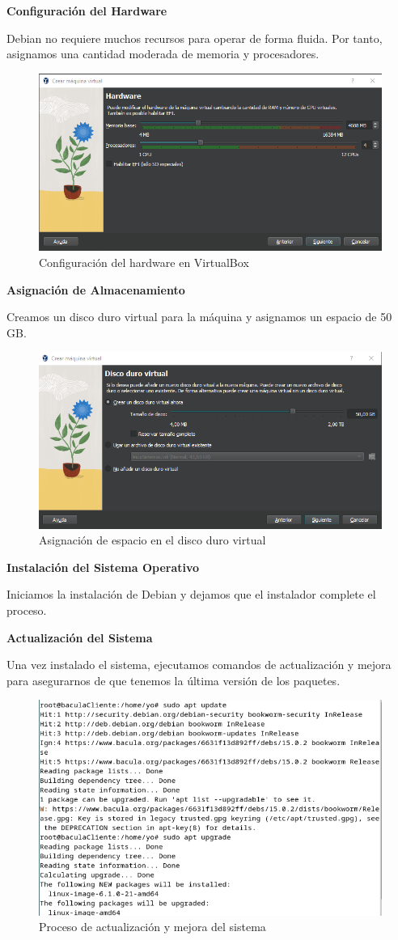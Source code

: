 \textbf{Configuración del Hardware}\medskip


Debian no requiere muchos recursos para operar de forma fluida. Por tanto, asignamos una cantidad moderada de memoria y procesadores.

\begin{figure}[H]
    \centering
    \includegraphics[width=0.5\linewidth]{instalacionBacula/vbhardware.png}
    \caption{Configuración del hardware en VirtualBox}
\end{figure}

\textbf{Asignación de Almacenamiento}\medskip


Creamos un disco duro virtual para la máquina y asignamos un espacio de 50 GB.

\begin{figure}[H]
    \centering
    \includegraphics[width=0.5\linewidth]{instalacionBacula/vbDisco.png}
    \caption{Asignación de espacio en el disco duro virtual}
\end{figure}

\textbf{Instalación del Sistema Operativo}\medskip


Iniciamos la instalación de Debian y dejamos que el instalador complete el proceso.

\textbf{Actualización del Sistema}\medskip


Una vez instalado el sistema, ejecutamos comandos de actualización y mejora para asegurarnos de que tenemos la última versión de los paquetes.

\begin{figure}[H]
    \centering
    \includegraphics[width=0.5\linewidth]{instalacionBacula/Update y upgrade.png}
    \caption{Proceso de actualización y mejora del sistema}
\end{figure}

